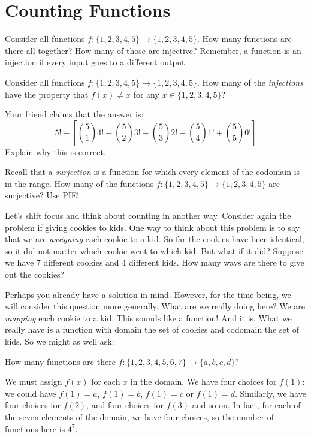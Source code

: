 \documentclass[12pt]{article}
\begin{document}
\section{Counting Functions}

  


\begin{activity}
\begin{questions}
\question Consider all functions $f: \{1,2,3,4,5\} \to \{1,2,3,4,5\}$.  How many functions are there all together?  How many of those are injective?  Remember, a function is an injection if every input goes to a different output.

\question Consider all functions $f: \{1,2,3,4,5\} \to \{1,2,3,4,5\}$.  How many of the {\em injections} have the property that $f(x) \ne x$ for any $x \in \{1,2,3,4,5\}$?

Your friend claims that the answer is:
\[5! - \left[ {5\choose 1}4! - {5 \choose 2}3! + {5\choose 3}2! - {5 \choose 4}1! + {5\choose 5}0! \right]\]
Explain why this is correct.

\question Recall that a {\em surjection} is a function for which every element of the codomain is in the range.  How many of the functions $f: \{1,2,3,4,5\} \to \{1,2,3,4,5\}$ are surjective?  Use PIE!

\end{questions}
\end{activity}

Let's shift focus and think about counting in another way.  Consider again the problem if giving cookies to kids.  One way to think about this problem is to say that we are {\em assigning} each cookie to a kid.  So far the cookies have been identical, so it did not matter which cookie went to which kid.  But what if it did?  Suppose we have 7 different cookies and 4 different kids.  How many ways are there to give out the cookies?

Perhaps you already have a solution in mind.  However, for the time being, we will consider this question more generally.  What are we really doing here?  We are {\em mapping} each cookie to a kid.  This sounds like a function!  And it is.  What we really have is a function with domain the set of cookies and codomain the set of kids.  So we might as well ask:

\begin{example}
 How many functions are there $f: \{1,2,3,4,5,6,7\} \to \{a,b,c,d\}$?\footnotemark
 \begin{solution}
 	We must assign $f(x)$ for each $x$ in the domain.  We have four choices for $f(1)$: we could have $f(1) = a$, $f(1) = b$, $f(1) = c$ or $f(1) = d$.  Similarly, we have four choices for $f(2)$, and four choices for $f(3)$ and so on.  In fact, for each of the seven elements of the domain, we have four choices, so the number of functions here is $4^7$.  
 \end{solution}
\end{example}
\end{document}
